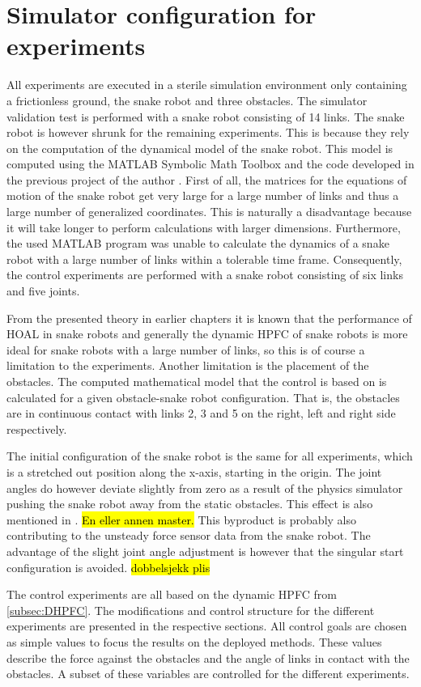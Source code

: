 \section{Simulator configuration for experiments}\label{sec:sim-config-exp}

All experiments are executed in a sterile simulation environment only containing a frictionless ground, the snake robot and three obstacles. The simulator validation test is performed with a snake robot consisting of 14 links. The snake robot is however shrunk for the remaining experiments. This is because they rely on the computation of the dynamical model of the snake robot. This model is computed using the MATLAB Symbolic Math Toolbox \cite{matlabsymbolic} and the code developed in the previous project of the author \cite{AtussaProsjektoppgp}. First of all, the matrices for the equations of motion of the snake robot get very large for a large number of links and thus a large number of generalized coordinates. This is naturally a disadvantage because it will take longer to perform calculations with larger dimensions. Furthermore, the used MATLAB program was unable to calculate the dynamics of a snake robot with a large number of links within a tolerable time frame. Consequently, the control experiments are performed with a snake robot consisting of six links and five joints.

From the presented theory in earlier chapters it is known that the performance of HOAL in snake robots and generally the dynamic HPFC of snake robots is more ideal for snake robots with a large number of links, so this is of course a limitation to the experiments. Another limitation is the placement of the obstacles. The computed mathematical model that the control is based on is calculated for a given obstacle-snake robot configuration. That is, the obstacles are in continuous contact with links 2, 3 and 5 on the right, left and right side respectively.

The initial configuration of the snake robot is the same for all experiments, which is a stretched out position along the x-axis, starting in the origin. The joint angles do however deviate slightly from zero as a result of the physics simulator pushing the snake robot away from the static obstacles. This effect is also mentioned in \cite{}. \hl{En eller annen master.} This byproduct is probably also contributing to the unsteady force sensor data from the snake robot. The advantage of the slight joint angle adjustment is however that the singular start configuration is avoided. \hl{dobbelsjekk plis} 

The control experiments are all based on the dynamic HPFC from \ref{subsec:DHPFC}. The modifications and control structure for the different experiments are presented in the respective sections. All control goals are chosen as simple values to focus the results on the deployed methods. These values describe the force against the obstacles and the angle of links in contact with the obstacles. A subset of these variables are controlled for the different experiments. 